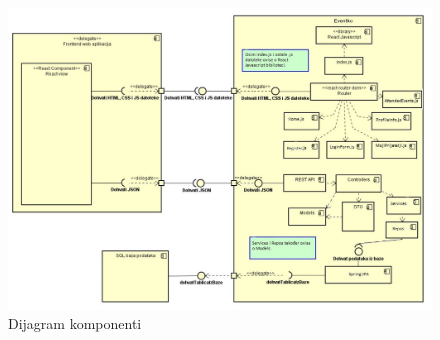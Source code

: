 				\begin{figure}[H]
					\includegraphics[width=\columnwidth]{slike/Komponente.jpg}
					\caption{Dijagram komponenti}
				\end{figure}
		 	
		 		
			 	